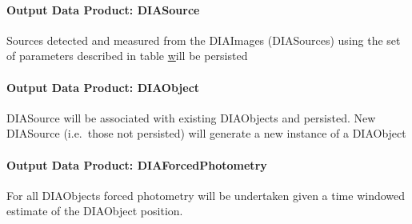 \paragraph{Output Data Product: DIASource}

Sources detected and measured from the DIAImages (DIASources) using the set of parameters described in table \hyperref[table:ap_features] will be persisted


\paragraph{Output Data Product: DIAObject}

DIASource will be associated with existing DIAObjects and persisted. New DIASource (i.e.\ those not persisted) will generate a new instance of a DIAObject 

\paragraph{Output Data Product: DIAForcedPhotometry}

For all DIAObjects forced photometry will be undertaken given a time windowed estimate of the DIAObject position.


